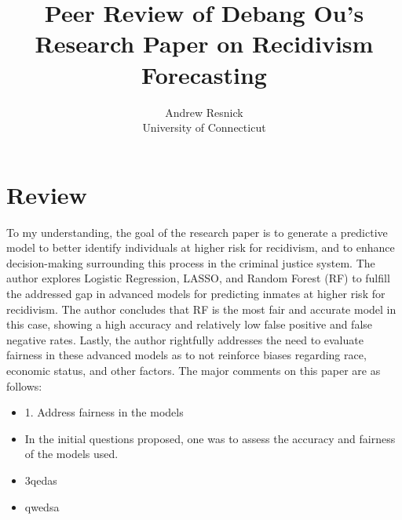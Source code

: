 \documentclass[12pt]{article}
\title{Peer Review of Debang Ou's Research Paper on Recidivism Forecasting}
\author{Andrew Resnick\\
  University of Connecticut
}
\begin{document}
\maketitle

\section{Review}
To my understanding, the goal of the research paper is to generate a predictive model to better identify individuals at higher risk for recidivism, and to enhance decision-making surrounding this process in the criminal justice system.
The author explores Logistic Regression, LASSO, and Random Forest (RF) to fulfill the addressed gap in advanced models for predicting inmates at higher risk for recidivism.
The author concludes that RF is the most fair and accurate model in this case, showing a high accuracy and relatively low false positive and false negative rates.
Lastly, the author rightfully addresses the need to evaluate fairness in these advanced models as to not reinforce biases regarding race, economic status, and other factors.
The major comments on this paper are as follows:
\begin{itemize}
\item 1. Address fairness in the models
    \item In the initial questions proposed, one was to assess the accuracy and fairness of the models used. 
\item 3qedas
\item qwedsa
\end{itemize}
\end{document}
